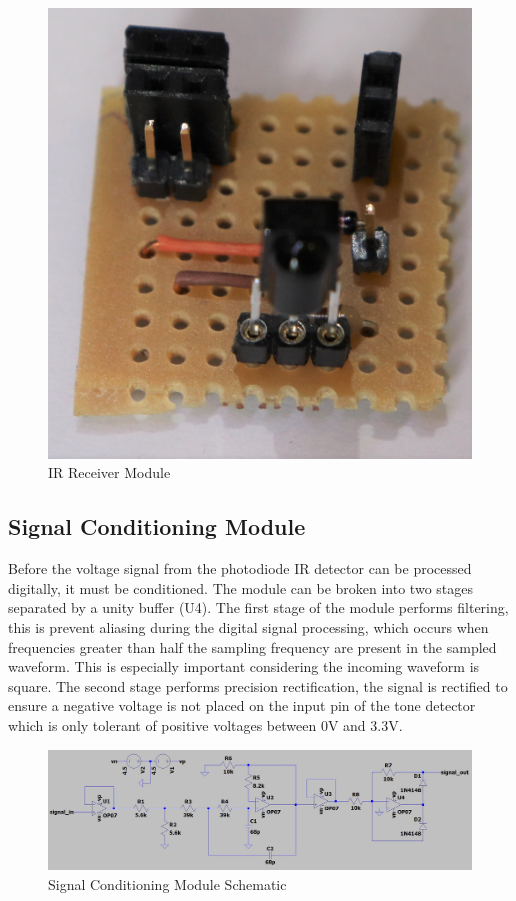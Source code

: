 \begin{figure}[H]
	\centering
	\includegraphics[width=.6\textwidth]{figures/modules/ir_receiver.jpg}
	\caption{IR Receiver Module}
	\label{fig:module_ir_receiver}
\end{figure}

\subsection{Signal Conditioning Module}

Before the voltage signal from the photodiode IR detector can be processed digitally, it must be conditioned. The module can be broken into two stages separated by a unity buffer (U4). The first stage of the module performs filtering, this is prevent aliasing during the digital signal processing, which occurs when frequencies greater than half the sampling frequency are present in the sampled waveform. This is especially important considering the incoming waveform is square. The second stage performs precision rectification, the signal is rectified to ensure a negative voltage is not placed on the input pin of the tone detector which is only tolerant of positive voltages between 0V and 3.3V.

\begin{figure}[H]
	\centering
	\includegraphics[width=\textwidth]{figures/design/filter_and_rectify}
	\caption{Signal Conditioning Module Schematic}
	\label{fig:schematic_filter_and_rectify}
\end{figure}

